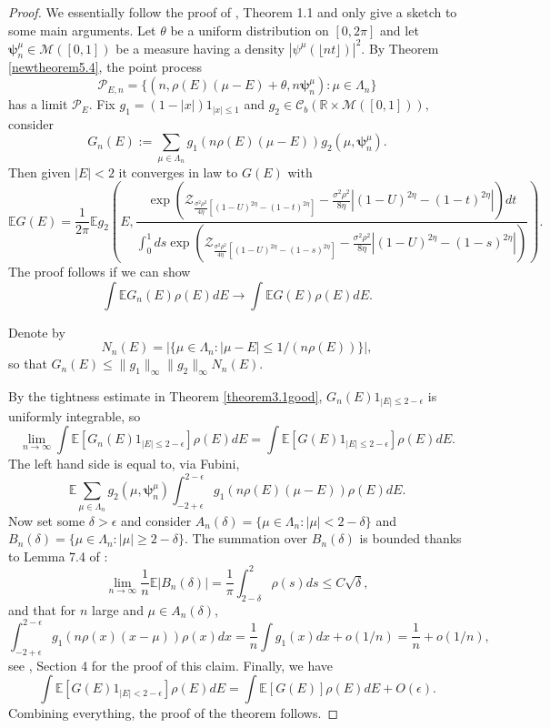 \documentclass[12pt, reqno]{amsart}
\theoremstyle{definition}
\theoremstyle{remark}
\numberwithin{equation}{section}
\begin{document}
\begin{proof} We essentially follow the proof of \cite{rifkind2018eigenvectors}, Theorem 1.1 and only give a sketch to some main arguments. Let $\theta$ be a uniform distribution on $[0,2\pi]$ and let $\boldsymbol{\psi}_n^\mu\in\mathcal{M}([0,1])$ be a measure having a density $|\psi^\mu(\lfloor nt\rfloor)|^2$. By Theorem \ref{newtheorem5.4}, the point process
$$\mathcal{P}_{E,n}=\{(n,\rho(E)(\mu-E)+\theta,n\boldsymbol{\psi}_n^\mu):\mu\in\Lambda_n\}$$
has a limit $\mathcal{P}_E$. Fix $g_1=(1-|x|)1_{|x|\leq 1}$ and $g_2\in\mathcal{C}_b(\mathbb{R}\times\mathcal{M}([0,1])),$ consider
$$G_n(E):=\sum_{\mu\in\Lambda_n}g_1(n\rho(E)(\mu-E))g_2(\mu,\boldsymbol{\psi}_n^\mu).
$$ Then given $|E|<2$ it converges in law to $G(E)$ with
\begin{equation}
    \mathbb{E}G(E)=\frac{1}{2\pi}\mathbb{E}g_2\left(E,\frac{\exp\left(\mathcal{Z}_{\frac{\sigma^2\rho^2}{4\eta}[(1-U)^{2\eta}-(1-t)^{2\eta}]}-\frac{\sigma^2\rho^2}{8\eta}\left|(1-U)^{2\eta}-(1-t)^{2\eta}\right|\right)dt}{\int_0^1 ds \exp\left(\mathcal{Z}_{\frac{\sigma^2\rho^2}{4\eta}[(1-U)^{2\eta}-(1-s)^{2\eta}]}-\frac{\sigma^2\rho^2}{8\eta}\left|(1-U)^{2\eta}-(1-s)^{2\eta}\right|\right)}\right).    
\end{equation}
The proof follows if we can show $$\int\mathbb{E}G_n(E)\rho(E)dE\to\int\mathbb{E}G(E)\rho(E)dE.$$ 

Denote by $$N_n(E)=|\{\mu\in\Lambda_n:|\mu-E|\leq 1/(n\rho(E))\}|,$$
so that $G_n(E)\leq \|g_1\|_\infty \|g_2\|_\infty N_n(E).$ 


By the tightness estimate in Theorem \ref{theorem3.1good}, $G_n(E)1_{|E|\leq 2-\epsilon}$ is uniformly integrable, so\begin{equation}
    \lim_{n\to\infty}\int \mathbb{E}[G_n(E)1_{|E|\leq 2-\epsilon}]\rho(E)dE=\int\mathbb{E}[G(E)1_{|E|\leq 2-\epsilon}]\rho(E)dE.
\end{equation}
The left hand side is equal to, via Fubini,
$$\mathbb{E}\sum_{\mu\in\Lambda_n}g_2(\mu,\boldsymbol{\psi}_n^\mu)\int_{-2+\epsilon}^{2-\epsilon}g_1(n\rho(E)(\mu-E))\rho(E)dE.$$ Now set some $\delta>\epsilon$ and consider $A_n(\delta)=\{\mu\in \Lambda_n:|\mu|<2-\delta\}$ and $B_n(\delta)=\{\mu\in\Lambda_n:|\mu|\geq 2-\delta\}$. The summation over $B_n(\delta)$ is bounded thanks to Lemma 7.4 of \cite{nakano2022shape}:
$$\lim_{n\to\infty}\frac{1}{n}\mathbb{E}|B_n(\delta)|=\frac{1}{\pi}\int_{2-\delta}^2 \rho(s)ds\leq C\sqrt{\delta},$$ and that for $n$ large and $\mu\in A_n(\delta)$,
$$\int_{-2+\epsilon}^{2-\epsilon}g_1(n\rho(x)(x-\mu))\rho(x)dx=\frac{1}{n}\int g_1(x)dx+o(1/n)=\frac{1}{n}+o(1/n),
$$ see \cite{nakano2022shape}, Section 4 for the proof of this claim. Finally, we have
$$\int\mathbb{E}[G(E)1_{|E|<2-\epsilon}]\rho(E)dE=\int \mathbb{E}[G(E)]\rho(E)dE+O(\epsilon).$$
Combining everything, the proof of the theorem follows.
\end{proof}
\end{document}
